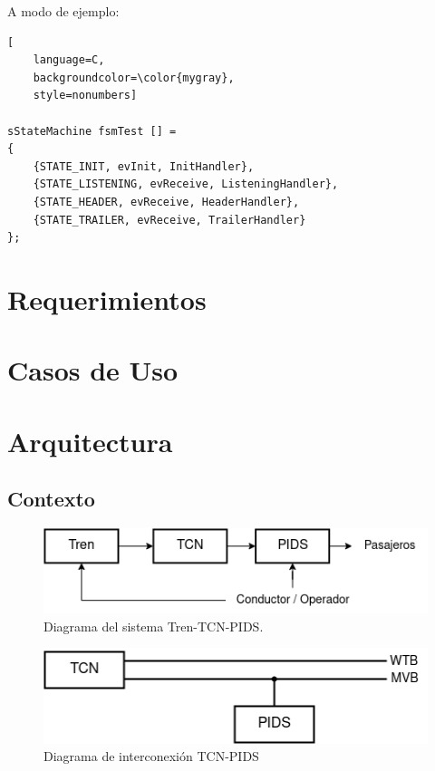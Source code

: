 A modo de ejemplo:

\begin{lstlisting}[
	language=C, 
	backgroundcolor=\color{mygray},
	style=nonumbers]

sStateMachine fsmTest [] = 
{
	{STATE_INIT, evInit, InitHandler},
	{STATE_LISTENING, evReceive, ListeningHandler},
	{STATE_HEADER, evReceive, HeaderHandler},
	{STATE_TRAILER, evReceive, TrailerHandler}
};
\end{lstlisting}
    


\section{Requerimientos}

\pagebreak
\section{Casos de Uso}

\pagebreak

\section{Arquitectura}

\subsection{Contexto}
\begin{figure}[ht]
	\centering
	\includegraphics[width=1\textwidth]{./Figures/diagTrenTcnPids.png}
	\caption{Diagrama del sistema Tren-TCN-PIDS.}
	\label{fig:diagTrenTcnPids}
\end{figure}

\begin{figure}[ht]
	\centering
	\includegraphics[width=1\textwidth]{./Figures/diagTcnPidsBusesWtbMvb.png}
	\caption{Diagrama de interconexión TCN-PIDS}
	\label{fig:diagTcnPidsBuusesWtbMvb}
\end{figure}


